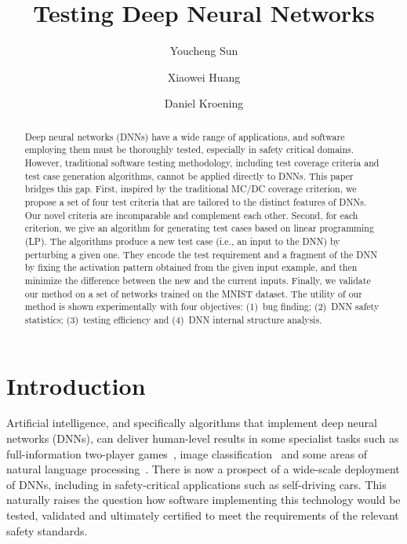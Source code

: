 \documentclass[runningheads,a4paper]{llncs}
\begin{document}
\title{Testing Deep Neural Networks}

\author{Youcheng Sun \and Xiaowei Huang \and Daniel Kroening}


\maketitle

\newcommand\true{\textsf{true}\xspace}
\newcommand\false{\textsf{false}\xspace}

\begin{abstract}
%
Deep neural networks (DNNs) have a wide range of applications, and software
employing them must be thoroughly tested, especially in safety
critical domains.  However, traditional software testing methodology,
including test coverage criteria and test case generation algorithms, cannot
be applied directly to DNNs.  This paper bridges this gap.  First, inspired
by the traditional MC/DC coverage criterion, we propose a set of four test
criteria that are tailored to the distinct features of DNNs.  Our novel
criteria are incomparable and complement each other.  Second, for each
criterion, we give an algorithm for generating test cases based on linear
programming (LP).  The algorithms produce a new test case (i.e., an input to
the DNN) by perturbing a given one.  They encode the test requirement and a
fragment of the DNN by fixing the activation pattern obtained from the given
input example, and then minimize the difference between the new and the
current inputs.  Finally, we validate our method on a set of networks
trained on the MNIST dataset.  The utility of our method is shown
experimentally with four objectives: (1)~bug finding; (2)~DNN safety
statistics; (3)~testing efficiency and (4)~DNN internal structure analysis.
%
\end{abstract}


\section{Introduction}

Artificial intelligence, and specifically algorithms that implement deep
neural networks (DNNs), can deliver human-level results in some specialist
tasks such as full-information two-player games~\cite{alphaGoZero}, image
classification~\cite{imageNetChallenge} and some areas of natural language
processing~\cite{Goldberg2016}.  There is now a prospect of a wide-scale
deployment of DNNs, including in safety-critical applications such as
self-driving cars.  This naturally raises the question how software
implementing this technology would be tested, validated and ultimately
certified to meet the requirements of the relevant safety standards.
\end{document}
